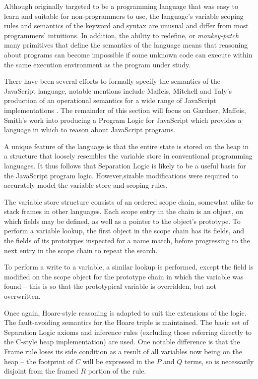 \documentclass[a4paper]{report}
\begin{document}
  Although originally targeted to be a programming language that was easy to
  learn and suitable for non-programmers to use, the language's variable scoping
  rules and semantics of the  keyword and  syntax are unusual
  and differ from most programmers' intuitions. In addition, the ability to
  redefine, or \emph{monkey-patch} many primitives that define the semantics of
  the language means that reasoning about programs can become impossible if
  some unknown code can execute within the same execution environment as the
  program under study.

  There have been several efforts to formally specify the semantics of the
  JavaScript language, notable mentions include Maffeis, Mitchell and Taly's
  production of an operational semantics for a wide range of JavaScript
  implementations \cite{maffeis-jsopsem}. The remainder of this section will
  focus on Gardner, Maffeis, Smith's work \cite{gms-popl} into producing a
  Program Logic for JavaScript which provides a language in which to reason
  about JavaScript programs.

  A unique feature of the
  language is that the entire state is stored on the heap in a structure that
  loosely resembles the variable store in conventional programming languages. It
  thus follows that Separation Logic is likely to be a useful basis for the
  JavaScript program logic. However,sizable modifications were required to
  accurately model the variable store and scoping rules.


  The variable store structure consists of an ordered scope chain,
  somewhat alike to
  stack frames in other languages. Each scope entry in the chain is an object,
  on which fields may be defined, as well as a pointer to the object's
  prototype. To perform a variable lookup, the first object in the scope chain has
  its fields, and the fields of its prototypes inspected for a name match, before
  progressing to the next entry in the scope chain to repeat the search.

  To perform a write to a variable, a similar lookup is performed, except the
  field is modified on the scope object for the prototype chain in which the
  variable was found -- this is so that the prototypical variable is overridden,
  but not overwritten.

  Once again, Hoare-style reasoning is adapted to suit the extensions of the
  logic. The fault-avoiding semantics for the Hoare triple is maintained. The
  basic set of Separation Logic axioms and inference rules (excluding those
  referring directly to the C-style heap implementation) are used. One notable
  difference is that the Frame rule loses its side condition as a result of all
  variables now being on the heap -- the footprint of $C$ will be expressed in
  the $P$ and $Q$ terms, so is necessarily disjoint from the framed $R$ portion of
  the rule.

\end{document}
